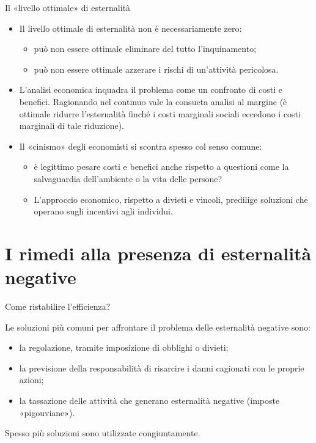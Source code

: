 \documentclass[aspectratio=64,12pt]{beamer}
\begin{document}
\begin{frame}{Il «livello ottimale» di esternalità}
\begin{itemize}
\item Il livello ottimale di esternalità non è necessariamente zero:
\begin{itemize}
\item può non essere ottimale eliminare del tutto l'inquinamento;
\item può non essere ottimale azzerare i rischi di un'attività pericolosa.
\end{itemize}
\item L’analisi economica inquadra il problema come un confronto di costi e
benefici. Ragionando nel continuo vale la consueta analisi al margine
(è ottimale ridurre l'esternalità finché i costi marginali sociali eccedono i costi
marginali di tale riduzione).
\item Il «cinismo» degli economisti si scontra spesso col senso comune:
\begin{itemize}
\item è legittimo pesare costi e benefici anche rispetto a questioni come la
salvaguardia dell'ambiente o la vita delle persone?
\item L’approccio economico, rispetto a divieti e vincoli, predilige soluzioni
che operano sugli incentivi agli individui.
\end{itemize}
\end{itemize}
\end{frame}

\section{I rimedi alla presenza di esternalità negative}


\begin{frame}{Come ristabilire l'efficienza?}
\fontsize{13}{16}\selectfont

Le soluzioni più comuni per affrontare il problema delle esternalità negative sono:
\begin{itemize}
\item la \alert{regolazione}, tramite imposizione di obblighi o divieti;
\item la previsione della \alert{responsabilità} di risarcire i danni cagionati con le proprie azioni;
\item la \alert{tassazione} delle attività che generano esternalità negative (imposte «pigouviane»).
\end{itemize}

Spesso più soluzioni sono utilizzate congiuntamente.
\end{frame}
\end{document}
